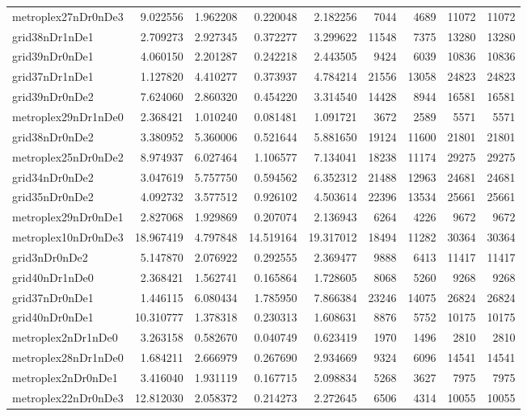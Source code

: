 \begin{longtable}{|l|r|r|r|r|r|r|r|r|}
metroplex27nDr0nDe3 & 9.022556 & 1.962208 & 0.220048 & 2.182256 & 7044 & 4689 & 11072 & 11072 \\
grid38nDr1nDe1 & 2.709273 & 2.927345 & 0.372277 & 3.299622 & 11548 & 7375 & 13280 & 13280 \\
grid39nDr0nDe1 & 4.060150 & 2.201287 & 0.242218 & 2.443505 & 9424 & 6039 & 10836 & 10836 \\
grid37nDr1nDe1 & 1.127820 & 4.410277 & 0.373937 & 4.784214 & 21556 & 13058 & 24823 & 24823 \\
grid39nDr0nDe2 & 7.624060 & 2.860320 & 0.454220 & 3.314540 & 14428 & 8944 & 16581 & 16581 \\
metroplex29nDr1nDe0 & 2.368421 & 1.010240 & 0.081481 & 1.091721 & 3672 & 2589 & 5571 & 5571 \\
grid38nDr0nDe2 & 3.380952 & 5.360006 & 0.521644 & 5.881650 & 19124 & 11600 & 21801 & 21801 \\
metroplex25nDr0nDe2 & 8.974937 & 6.027464 & 1.106577 & 7.134041 & 18238 & 11174 & 29275 & 29275 \\
grid34nDr0nDe2 & 3.047619 & 5.757750 & 0.594562 & 6.352312 & 21488 & 12963 & 24681 & 24681 \\
grid35nDr0nDe2 & 4.092732 & 3.577512 & 0.926102 & 4.503614 & 22396 & 13534 & 25661 & 25661 \\
metroplex29nDr0nDe1 & 2.827068 & 1.929869 & 0.207074 & 2.136943 & 6264 & 4226 & 9672 & 9672 \\
metroplex10nDr0nDe3 & 18.967419 & 4.797848 & 14.519164 & 19.317012 & 18494 & 11282 & 30364 & 30364 \\
grid3nDr0nDe2 & 5.147870 & 2.076922 & 0.292555 & 2.369477 & 9888 & 6413 & 11417 & 11417 \\
grid40nDr1nDe0 & 2.368421 & 1.562741 & 0.165864 & 1.728605 & 8068 & 5260 & 9268 & 9268 \\
grid37nDr0nDe1 & 1.446115 & 6.080434 & 1.785950 & 7.866384 & 23246 & 14075 & 26824 & 26824 \\
grid40nDr0nDe1 & 10.310777 & 1.378318 & 0.230313 & 1.608631 & 8876 & 5752 & 10175 & 10175 \\
metroplex2nDr1nDe0 & 3.263158 & 0.582670 & 0.040749 & 0.623419 & 1970 & 1496 & 2810 & 2810 \\
metroplex28nDr1nDe0 & 1.684211 & 2.666979 & 0.267690 & 2.934669 & 9324 & 6096 & 14541 & 14541 \\
metroplex2nDr0nDe1 & 3.416040 & 1.931119 & 0.167715 & 2.098834 & 5268 & 3627 & 7975 & 7975 \\
metroplex22nDr0nDe3 & 12.812030 & 2.058372 & 0.214273 & 2.272645 & 6506 & 4314 & 10055 & 10055 \\

\end{longtable}
